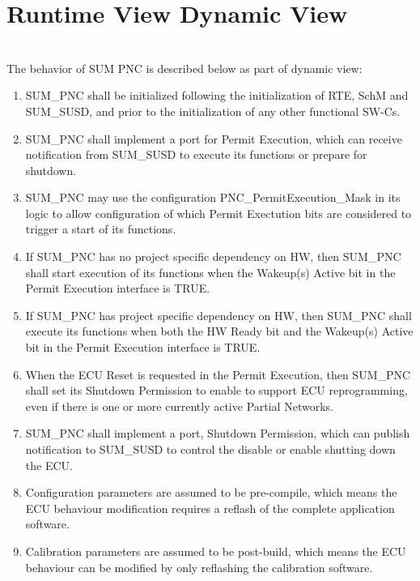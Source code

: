 \chapter{Runtime View Dynamic View}
\\
The behavior of SUM PNC is described below as part of dynamic view:

\begin{enumerate}
	\item SUM_PNC shall be initialized following the initialization of RTE, SchM and SUM_SUSD, and prior to the initialization of any other functional SW-Cs.
	\item SUM_PNC shall implement a port for Permit Execution, which can receive notification from SUM_SUSD to execute its functions or prepare for shutdown.
	\item SUM_PNC may use the configuration PNC_PermitExecution_Mask in its logic to allow configuration of which Permit Exectution bits are considered to trigger a start of its functions.
	\item If SUM_PNC has no project specific dependency on HW, then SUM_PNC shall start execution of its functions when the Wakeup(s) Active bit in the Permit Execution interface is TRUE.
	\item If SUM_PNC has project specific dependency on HW, then SUM_PNC shall execute its functions when both the HW Ready bit and the Wakeup(s) Active bit in the Permit Execution interface is TRUE.
	\item When the ECU Reset is requested in the Permit Execution, then SUM_PNC shall set its Shutdown Permission to enable to support ECU reprogramming, even if there is one or more currently active Partial Networks.
	\item SUM_PNC shall implement a port, Shutdown Permission, which can publish notification to SUM_SUSD to control the disable or enable shutting down the ECU.
	\item Configuration parameters are assumed to be pre-compile, which means the ECU behaviour modification requires a reflash of the complete application software. 
	\item Calibration parameters are assumed to be post-build, which means the ECU behaviour can be modified by only reflashing the calibration software.
\end{enumerate}

{      }

